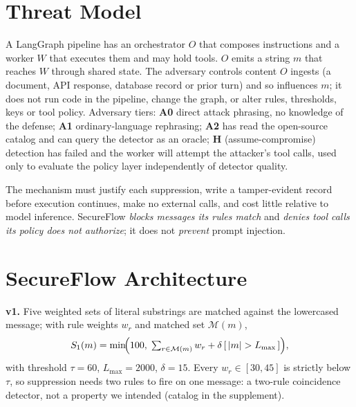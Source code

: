 \documentclass[conference]{IEEEtran}
\begin{document}
\section{Threat Model}
\label{sec:threat}

A LangGraph pipeline has an orchestrator $O$ that composes instructions and a worker
$W$ that executes them and may hold tools. $O$ emits a string $m$ that reaches $W$
through shared state. The adversary controls content $O$ ingests (a document, API
response, database record or prior turn) and so influences $m$; it does not run code in
the pipeline, change the graph, or alter rules, thresholds, keys or tool policy.
Adversary tiers: \textbf{A0} direct attack phrasing, no knowledge of the defense;
\textbf{A1} ordinary-language rephrasing; \textbf{A2} has read the open-source catalog
and can query the detector as an oracle; \textbf{H} (assume-compromise) detection has
failed and the worker will attempt the attacker's tool calls, used only to evaluate
the policy layer independently of detector quality.

The mechanism must justify each suppression, write a tamper-evident record before
execution continues, make no external calls, and cost little relative to model
inference. SecureFlow \emph{blocks messages its rules match} and \emph{denies tool
calls its policy does not authorize}; it does not \emph{prevent} prompt injection.

\section{SecureFlow Architecture}
\label{sec:arch}

\textbf{v1.} Five weighted sets of literal substrings are matched against the
lowercased message; with rule weights $w_r$ and matched set $\mathcal{M}(m)$,
\begin{equation}
  S_{1}(m) = \min\!\Bigl(100,\; \textstyle\sum_{r\in\mathcal{M}(m)} w_r
         + \delta\,[\,|m|>L_{\max}\,]\Bigr),
  \label{eq:score1}
\end{equation}
with threshold $\tau=60$, $L_{\max}=2000$, $\delta=15$. Every $w_r\in[30,45]$ is
strictly below $\tau$, so suppression needs two rules to fire on one message: a
two-rule coincidence detector, not a property we intended (catalog in the supplement).
\end{document}
